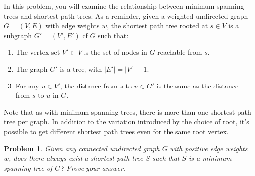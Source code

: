 \documentclass[psamsfonts]{amsart}
\newtheorem{prob}{Problem}[section]
\theoremstyle{definition}
\theoremstyle{remark}
\numberwithin{equation}{section}
\begin{document}
In this problem, you will examine the relationship between minimum spanning trees and shortest
path trees. As a reminder, given a weighted undirected graph $G = (V,E)$ with edge weights $w$,
the shortest path tree rooted at $s \in V$ is a subgraph $G' = (V',E')$ of $G$ such that:
\begin{enumerate}
\item The vertex set $V' \subset V$ is the set of nodes in $G$ reachable from $s$.
\item The graph $G'$ is a tree, with $|E'| = |V'| - 1$.
\item For any $u \in V'$, the distance from $s$ to $u \in G'$ is the same as the distance from $s$ to $u$ in $G$.
\end{enumerate}
Note that as with minimum spanning trees, there is more than one shortest path tree per graph. In
addition to the variation introduced by the choice of root, it's possible to get different shortest path
trees even for the same root vertex.

\begin{prob}
Given any connected undirected graph $G$ with positive edge weights $w$, does there
always exist a shortest path tree $S$ such that $S$ is a minimum spanning tree of $G$?
Prove your answer.
\end{prob}
\end{document}
